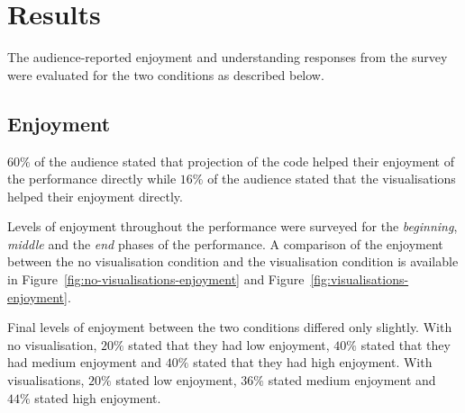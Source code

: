 \section{Results}

The audience-reported enjoyment and understanding responses from the survey were evaluated for the two conditions as described below.

\subsection{Enjoyment}

$60\%$ of the audience stated that projection of the code helped their enjoyment of the performance directly while $16\%$ of the audience stated that the visualisations helped their enjoyment directly.

Levels of enjoyment throughout the performance were surveyed for the \emph{beginning}, \emph{middle} and the \emph{end} phases of the performance. A comparison of the enjoyment between the no visualisation condition and the visualisation condition is available in Figure~\ref{fig:no-visualisations-enjoyment} and Figure~\ref{fig:visualisations-enjoyment}.

Final levels of enjoyment between the two conditions differed only slightly. With no visualisation, $20\%$ stated that they had low enjoyment, $40\%$ stated that they had medium enjoyment and $40\%$ stated that they had high enjoyment. With visualisations, $20\%$ stated low enjoyment, $36\%$ stated medium enjoyment and $44\%$ stated high enjoyment.


